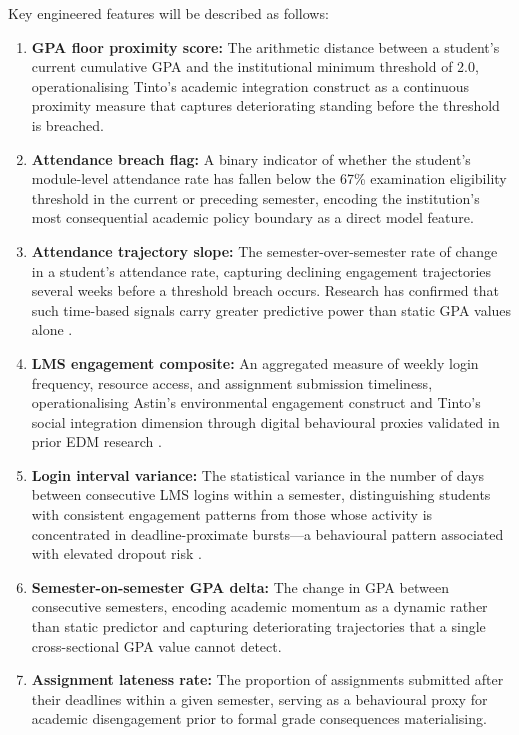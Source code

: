 \documentclass[12pt]{report}
\begin{document}
Key engineered features will be described as follows:

\begin{enumerate}
    \item \textbf{GPA floor proximity score:} The arithmetic distance between a
    student's current cumulative GPA and the institutional minimum threshold
    of 2.0, operationalising Tinto's academic integration construct as a
    continuous proximity measure that captures deteriorating standing before
    the threshold is breached.

    \item \textbf{Attendance breach flag:} A binary indicator of whether the
    student's module-level attendance rate has fallen below the 67\%
    examination eligibility threshold in the current or preceding semester,
    encoding the institution's most consequential academic policy boundary
    as a direct model feature.

    \item \textbf{Attendance trajectory slope:} The semester-over-semester
    rate of change in a student's attendance rate, capturing declining
    engagement trajectories several weeks before a threshold breach occurs.
    Research has confirmed that such time-based signals carry greater
    predictive power than static GPA values alone \parencite{Dirin2022,
    Morris2005}.

    \item \textbf{LMS engagement composite:} An aggregated measure of
    weekly login frequency, resource access, and assignment submission
    timeliness, operationalising Astin's environmental engagement construct
    and Tinto's social integration dimension through digital behavioural
    proxies validated in prior EDM research \parencite{Morris2005}.

    \item \textbf{Login interval variance:} The statistical variance in
    the number of days between consecutive LMS logins within a semester,
    distinguishing students with consistent engagement patterns from those
    whose activity is concentrated in deadline-proximate bursts---a
    behavioural pattern associated with elevated dropout risk
    \parencite{Dirin2022}.

    \item \textbf{Semester-on-semester GPA delta:} The change in GPA
    between consecutive semesters, encoding academic momentum as a dynamic
    rather than static predictor and capturing deteriorating trajectories
    that a single cross-sectional GPA value cannot detect.

    \item \textbf{Assignment lateness rate:} The proportion of assignments
    submitted after their deadlines within a given semester, serving as a
    behavioural proxy for academic disengagement prior to formal grade
    consequences materialising.
\end{enumerate}
\end{document}
